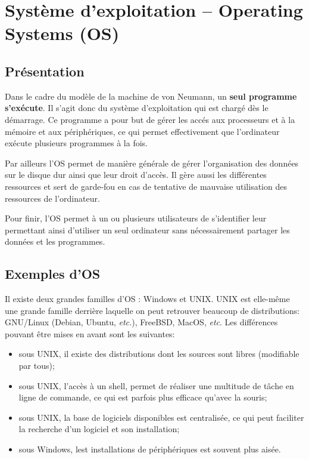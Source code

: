\section{Système d'exploitation -- Operating Systems (OS)}
\subsection{Présentation}

Dans le cadre du modèle de la machine de von Neumann, un\textbf{ seul programme s’exécute}. Il s'agit donc du système d'exploitation qui est chargé dès le démarrage.  Ce programme a pour but de gérer les accés aux processeurs et à la mémoire et aux périphériques, ce qui permet
effectivement que l’ordinateur exécute plusieurs programmes à la fois.

Par ailleurs l'OS permet de manière générale de gérer l'organisation des données sur le disque dur ainsi que leur droit d'accès. Il gère aussi les différentes ressources et sert de garde-fou en cas de tentative de mauvaise utilisation des ressources de l'ordinateur.

Pour finir, l'OS permet à un ou plusieurs utilisateurs de s'identifier leur permettant ainsi d'utiliser un seul ordinateur sans nécessairement partager les données et les programmes. 



\subsection{Exemples d'OS}
Il existe deux grandes familles d'OS : Windows et UNIX. UNIX est elle-même une grande famille derrière laquelle on peut retrouver beaucoup de distributions:  GNU/Linux (Debian, Ubuntu, \textit{etc.}), FreeBSD, MacOS, \textit{etc}. Les différences pouvant être mises en avant sont les suivantes:
\begin{itemize}
\item sous UNIX, il existe des distributions dont les sources sont libres (modifiable par tous);
\item sous UNIX, l'accès à un shell, permet de réaliser une multitude de tâche en ligne de commande, ce qui est parfois plus efficace qu'avec la souris;
\item sous UNIX, la base de logiciels disponibles est centralisée, ce qui peut faciliter la recherche d'un logiciel et son installation;
\item sous Windows, lest installations de périphériques est souvent plus aisée. 
\end{itemize}

